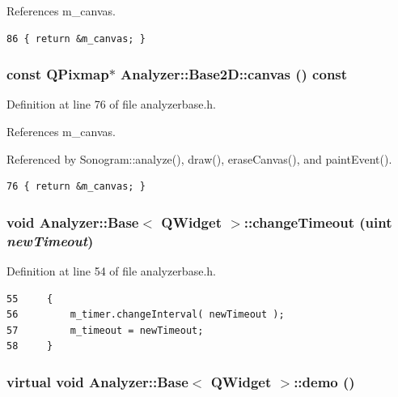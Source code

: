 References m\_\-canvas.



\footnotesize\begin{verbatim}86 { return &m_canvas; }
\end{verbatim}\normalsize 
{}
\subsubsection{\setlength{\rightskip}{0pt plus 5cm}const QPixmap$\ast$ Analyzer::Base2D::canvas () const\hspace{0.3cm}{\tt  [inline]}}\label{classAnalyzer_1_1Base2D_Sonograma7}




Definition at line 76 of file analyzerbase.h.

References m\_\-canvas.

Referenced by Sonogram::analyze(), draw(), erase\-Canvas(), and paint\-Event().



\footnotesize\begin{verbatim}76 { return &m_canvas; }
\end{verbatim}\normalsize 
{}
\subsubsection{\setlength{\rightskip}{0pt plus 5cm}void {\bf Analyzer::Base}$<$ {\bf QWidget}  $>$::change\-Timeout (uint {\em new\-Timeout})\hspace{0.3cm}{\tt  [inline, protected, inherited]}}\label{classAnalyzer_1_1Base_Analyzer_1_1Baseb6}




Definition at line 54 of file analyzerbase.h.



\footnotesize\begin{verbatim}55     {
56         m_timer.changeInterval( newTimeout );
57         m_timeout = newTimeout;
58     }
\end{verbatim}\normalsize 
{}
\subsubsection{\setlength{\rightskip}{0pt plus 5cm}virtual void {\bf Analyzer::Base}$<$ {\bf QWidget}  $>$::demo ()\hspace{0.3cm}{\tt  [protected, virtual, inherited]}}\label{classAnalyzer_1_1Base_Analyzer_1_1Baseb5}




